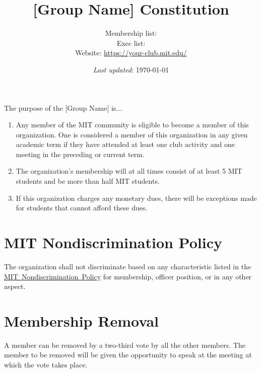 \documentclass[12pt]{article}
\def\groupname{[Group Name]\xspace}
\begin{document}
\title{\groupname Constitution}
\author{%
    Membership list:  \\
    Exec list:  \\
    Website: \url{https://your-club.mit.edu/}
}
\date{\textit{Last updated}: \today}

\maketitle




The purpose of the \groupname is...

\begin{enumerate}
    \item Any member of the MIT community is eligible to become a member of this organization.
    One is considered a member of this organization in any given academic term if they have attended at least one club activity and one meeting in the preceding or current term.

    \item The organization’s membership will at all times consist of at least 5 MIT students and be more than half MIT students.

    \item If this organization charges any monetary dues, there will be exceptions made for students that cannot afford these dues.
\end{enumerate}

\section{MIT Nondiscrimination Policy}
The organization shall not discriminate based on any characteristic listed in the \href{https://handbook.mit.edu/nondiscrimination}{MIT~Nondiscrimination~Policy} for membership, officer position, or in any other aspect.

\section{Membership Removal}
A member can be removed by a two-third vote by all the other members.
The member to be removed will be given the opportunity to speak at the meeting at which the vote takes place.
\end{document}
